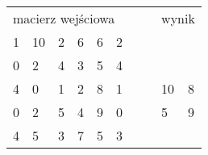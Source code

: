 \begin{table}[h]
\begin{tabular}{llllllllll}
\multicolumn{6}{l}{macierz wejściowa}                                                                                                                                                                                                                                                                 &  &                       & \multicolumn{2}{l}{wynik}                                                                        \\ \cline{1-6}
\multicolumn{1}{|l|}{\cellcolor[HTML]{CBCEFB}1} & \multicolumn{1}{l|}{\cellcolor[HTML]{CBCEFB}10} & \multicolumn{1}{l|}{\cellcolor[HTML]{CBCEFB}2} & \multicolumn{1}{l|}{\cellcolor[HTML]{FFFE65}6} & \multicolumn{1}{l|}{\cellcolor[HTML]{FFFE65}6} & \multicolumn{1}{l|}{\cellcolor[HTML]{FFFE65}2} &  &                       &                                                 &                                                \\ \cline{1-6}
\multicolumn{1}{|l|}{\cellcolor[HTML]{CBCEFB}0} & \multicolumn{1}{l|}{\cellcolor[HTML]{CBCEFB}2}  & \multicolumn{1}{l|}{\cellcolor[HTML]{CBCEFB}4} & \multicolumn{1}{l|}{\cellcolor[HTML]{FFFE65}3} & \multicolumn{1}{l|}{\cellcolor[HTML]{FFFE65}5} & \multicolumn{1}{l|}{\cellcolor[HTML]{FFFE65}4} &  &                       &                                                 &                                                \\ \cline{1-6} \cline{9-10} 
\multicolumn{1}{|l|}{\cellcolor[HTML]{CBCEFB}4} & \multicolumn{1}{l|}{\cellcolor[HTML]{CBCEFB}0}  & \multicolumn{1}{l|}{\cellcolor[HTML]{CBCEFB}1} & \multicolumn{1}{l|}{\cellcolor[HTML]{FFFE65}2} & \multicolumn{1}{l|}{\cellcolor[HTML]{FFFE65}8} & \multicolumn{1}{l|}{\cellcolor[HTML]{FFFE65}1} &  & \multicolumn{1}{l|}{} & \multicolumn{1}{l|}{\cellcolor[HTML]{CBCEFB}10} & \multicolumn{1}{l|}{\cellcolor[HTML]{FCFF2F}8} \\ \cline{1-6} \cline{9-10} 
\multicolumn{1}{|l|}{\cellcolor[HTML]{FFCB2F}0} & \multicolumn{1}{l|}{\cellcolor[HTML]{FFCB2F}2}  & \multicolumn{1}{l|}{\cellcolor[HTML]{FFCB2F}5} & \multicolumn{1}{l|}{\cellcolor[HTML]{32CB00}4} & \multicolumn{1}{l|}{\cellcolor[HTML]{32CB00}9} & \multicolumn{1}{l|}{\cellcolor[HTML]{32CB00}0} &  & \multicolumn{1}{l|}{} & \multicolumn{1}{l|}{\cellcolor[HTML]{FFC702}5}  & \multicolumn{1}{l|}{\cellcolor[HTML]{32CB00}9} \\ \cline{1-6} \cline{9-10} 
\multicolumn{1}{|l|}{\cellcolor[HTML]{FFCB2F}4} & \multicolumn{1}{l|}{\cellcolor[HTML]{FFCB2F}5}  & \multicolumn{1}{l|}{\cellcolor[HTML]{FFCB2F}3} & \multicolumn{1}{l|}{\cellcolor[HTML]{32CB00}7} & \multicolumn{1}{l|}{\cellcolor[HTML]{32CB00}5} & \multicolumn{1}{l|}{\cellcolor[HTML]{32CB00}3} &  &                       &                                                 &                                                \\ \cline{1-6}

\end{tabular}
\end{table}
